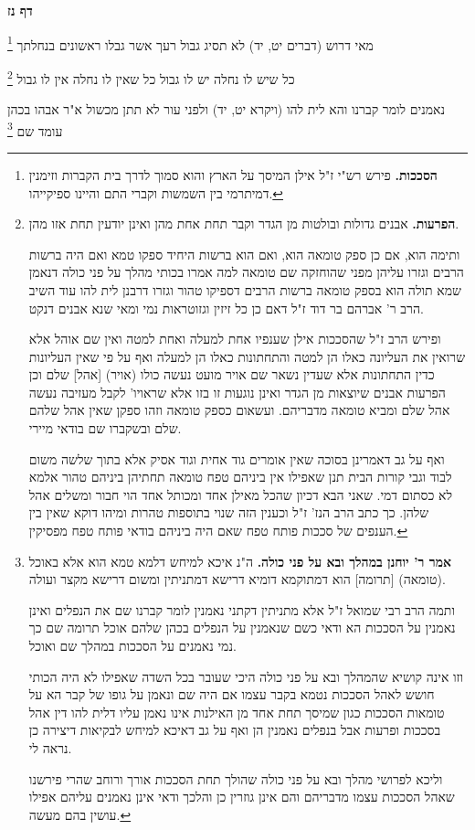 \documentclass[12pt, openany]{book}
\newcommand{\sethebfont}{
\fontsize{10.5pt}{21.0pt} \selectfont
}
\newcommand{\twocol}[1]{
	{\sethebfont \begin{multicols}{2}
			#1
	\end{multicols}}	
}
\newcommand{\sectname}{}
\newcommand{\newsection}[1]{
	\addcontentsline{toc}{section}{#1}
	\renewcommand{\sectname}{#1}	
	\vspace{-\baselineskip}
	\begin{center}
		\textbf{%
\fontsize{16pt}{16pt}\selectfont
			#1}
	\end{center}
	\vspace{-\baselineskip}
	\nopagebreak
}
\newcommand{\footnotecomment}[1]{\footnote{#1}}
\newcommand{\commenta}[1]{\footnotecomment{#1}}
\begin{document}
\newsection{דף נז}
\twocol{מאי דרוש  (דברים יט, יד) לא תסיג גבול רעך אשר גבלו ראשונים בנחלתך
\commenta{\textbf{הסככות.}  פירש רש"י ז"ל אילן המיסך על הארץ והוא סמוך לדרך בית הקברות וזימנין דמיתרמי בין השמשות וקברי התם והיינו ספיקייהו. }

כל שיש לו נחלה יש לו גבול כל שאין לו נחלה אין לו גבול 
\commenta{\textbf{הפרעות.}  אבנים גדולות ובולטות מן הגדר וקבר תחת אחת מהן ואינן יודעין תחת אזו מהן.\par ותימה הוא, אם כן ספק טומאה הוא, ואם הוא ברשות היחיד ספקו טמא ואם היה ברשות הרבים וגזרו עליהן מפני שהוחזקה שם טומאה למה אמרו בכותי מהלך על פני כולה דנאמן שמא תולה הוא בספק טומאה ברשות הרבים דספיקו טהור וגזרו דרבנן לית להו עוד השיב הרב ר' אברהם בר דוד ז"ל דאם כן כל זיזין וגזוטראות נמי ומאי שנא אבנים דנקט.\par ופירש הרב ז"ל שהסככות אילן שענפיו אחת למעלה ואחת למטה ואין שם אוהל אלא שרואין את העליונה כאלו הן למטה והתחתונות כאלו הן למעלה ואף על פי שאין העליונות כדין התחתונות אלא שעדין נשאר שם אויר מועט נעשה כולו (אויר) [אהל] שלם וכן הפרעות אבנים שיוצאות מן הגדר ואינן נוגעות זו בזו אלא שראויו' לקבל מעזיבה נעשה אהל שלם ומביא טומאה מדבריהם. ועשאום כספק טומאה וזהו ספקן שאין אהל שלהם שלם ובשקברו שם בודאי מיירי.\par  ואף על גב דאמרינן בסוכה שאין אומרים גוד אחית וגוד אסיק אלא בתוך שלשה משום לבוד וגבי קורות הבית תנן שאפילו אין ביניהם טפח טומאה תחתיהן ביניהם טהור אלמא לא כסתום דמי. שאני הבא דכיון שהכל מאילן אחד ומכותל אחד הוי חבור ומשלים אהל שלהן. כך כתב הרב הנז' ז"ל וכענין הזה שנוי בתוספות טהרות ומיהו דוקא שאין בין הענפים של סככות פותח טפח שאם היה ביניהם בודאי פותח טפח מפסיקין. }

נאמנים לומר קברנו  והא לית להו (ויקרא יט, יד) ולפני עור לא תתן מכשול  א"ר אבהו  בכהן עומד שם 
\commenta{\textbf{אמר ר' יוחנן במהלך ובא על פני כולה.}  ה"נ איכא למיחש דלמא טמא הוא אלא באוכל (טומאה) [תרומה] הוא דמתוקמא דומיא דרישא דמתניתין ומשום דרישא מקצר ועולה.\par  ותמה הרב רבי שמואל ז"ל אלא מתניתין דקתני נאמנין לומר קברנו שם את הנפלים ואינן נאמנין על הסככות הא ודאי כשם שנאמנין על הנפלים בכהן שלהם אוכל תרומה שם כך נמי נאמנים על הסככות במהלך שם ואוכל.\par  וזו אינה קושיא שהמהלך ובא על פני כולה היכי שעובר בכל השדה שאפילו לא היה הכותי חושש לאהל הסככות נטמא בקבר עצמו אם היה שם ונאמן על גופו של קבר הא על טומאות הסככות כגון שמיסך תחת אחד מן האילנות אינו נאמן עליו דלית להו דין אהל בסככות ופרעות אבל בנפלים נאמנין הן ואף על גב דאיכא למיחש לבקיאות דיצירה כן נראה לי.\par  וליכא לפרושי מהלך ובא על פני כולה שהולך תחת הסככות אורך ורוחב שהרי פירשנו שאהל הסככות עצמו מדבריהם והם אינן גוזרין כן והלכך ודאי אינן נאמנים עליהם אפילו עושין בהם מעשה. }

}
\end{document}
